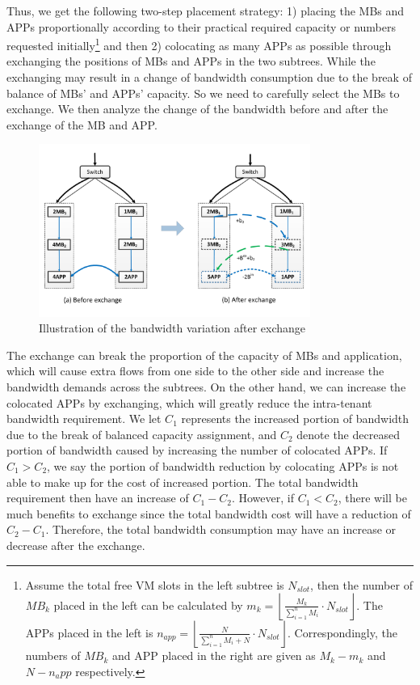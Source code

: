 \documentclass[review]{elsarticle}
\begin{document}
Thus, we get the following two-step placement strategy: 1) placing the MBs and APPs proportionally according to their practical required capacity or numbers requested initially\footnote{Assume the total free VM slots in the left subtree is $N_{slot}$, then the number of $MB_k$ placed in the left can be calculated by $m_k=\left\lfloor\frac{M_k}{\sum\limits_{i=1}^{n}M_i}\cdot N_{slot}\right\rfloor$. The APPs placed in the left is $n_{app}=\left\lfloor\frac{N}{\sum\limits_{i=1}^{n}M_i+N}\cdot N_{slot}\right\rfloor$. Correspondingly, the numbers of $MB_k$ and APP placed in the right are given as $M_k-m_k$ and $N-n_app$ respectively.}  and then 2) colocating as many APPs as possible through exchanging the positions of MBs and APPs in the two subtrees. While the exchanging may result in a change of bandwidth consumption due to the break of balance of MBs’ and APPs’ capacity. So we need to carefully select the MBs to exchange. We then analyze the change of the bandwidth before and after the exchange of the MB and APP.

\begin{figure}
	\centering
	\includegraphics[width=3.5in]{fig/exchange_example.pdf}
	\caption{Illustration of the bandwidth variation after exchange}
    \label{fig:exchange}
\end{figure}
The exchange can break the proportion of the capacity of MBs and application, which will cause extra flows from one side to the other side and increase the bandwidth demands across the subtrees. On the other hand, we can increase the colocated APPs by exchanging, which will greatly reduce the intra-tenant bandwidth requirement. We let $C_1$ represents the increased portion of bandwidth due to the break of balanced capacity assignment, and $C_2$ denote the decreased portion of bandwidth caused by increasing the number of colocated APPs. If $C_1>C_2$, we say the portion of bandwidth reduction by colocating APPs is not able to make up for the cost of increased portion. The total bandwidth requirement then have an increase of $C_1-C_2$. However, if $C_1<C_2$, there will be much benefits to exchange since the total bandwidth cost will have a reduction of $C_2-C_1$. Therefore, the total bandwidth consumption may have an increase or decrease after the exchange.
\end{document}
